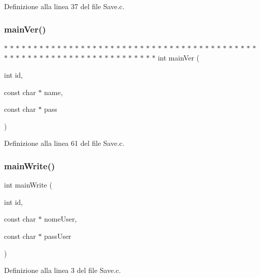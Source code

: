 Definizione alla linea 37 del file Save.\+c.

\mbox{\label{a00044_ab8031ecce68816277ecffe7667660900}} 
\subsubsection{\texorpdfstring{mainVer()}{mainVer()}}
{\footnotesize\ttfamily $\ast$ $\ast$ $\ast$ $\ast$ $\ast$ $\ast$ $\ast$ $\ast$ $\ast$ $\ast$ $\ast$ $\ast$ $\ast$ $\ast$ $\ast$ $\ast$ $\ast$ $\ast$ $\ast$ $\ast$ $\ast$ $\ast$ $\ast$ $\ast$ $\ast$ $\ast$ $\ast$ $\ast$ $\ast$ $\ast$ $\ast$ $\ast$ $\ast$ $\ast$ $\ast$ $\ast$ $\ast$ $\ast$ $\ast$ $\ast$ $\ast$ $\ast$ $\ast$ $\ast$ $\ast$ $\ast$ $\ast$ $\ast$ $\ast$ $\ast$ $\ast$ $\ast$ $\ast$ $\ast$ $\ast$ $\ast$ $\ast$ $\ast$ $\ast$ $\ast$ $\ast$ $\ast$ $\ast$ $\ast$ $\ast$ $\ast$ $\ast$ $\ast$ $\ast$ int main\+Ver (\begin{DoxyParamCaption}\item[{int}]{id,  }\item[{const char $\ast$}]{name,  }\item[{const char $\ast$}]{pass }\end{DoxyParamCaption})}



Definizione alla linea 61 del file Save.\+c.

\mbox{\label{a00044_a686fdc51e62cecfde609bd7635ac4b4b}} 
\subsubsection{\texorpdfstring{mainWrite()}{mainWrite()}}
{\footnotesize\ttfamily int main\+Write (\begin{DoxyParamCaption}\item[{int}]{id,  }\item[{const char $\ast$}]{nome\+User,  }\item[{const char $\ast$}]{pass\+User }\end{DoxyParamCaption})}



Definizione alla linea 3 del file Save.\+c.

